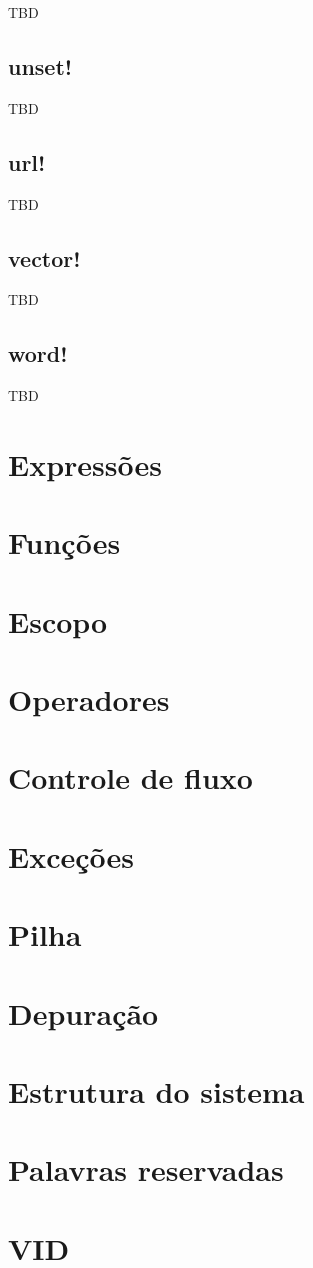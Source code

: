 \documentclass[12pt,a4paper]{article}
\begin{document}
TBD

\subsection{unset!}

TBD

\subsection{url!}

TBD

\subsection{vector!}

TBD

\subsection{word!}

TBD


\section{Expressões}
\section{Funções}
\section{Escopo}
\section{Operadores}
\section{Controle de fluxo}
\section{Exceções}
\section{Pilha}
\section{Depuração}
\section{Estrutura do sistema}
\section{Palavras reservadas}
\section{VID}
\end{document}
